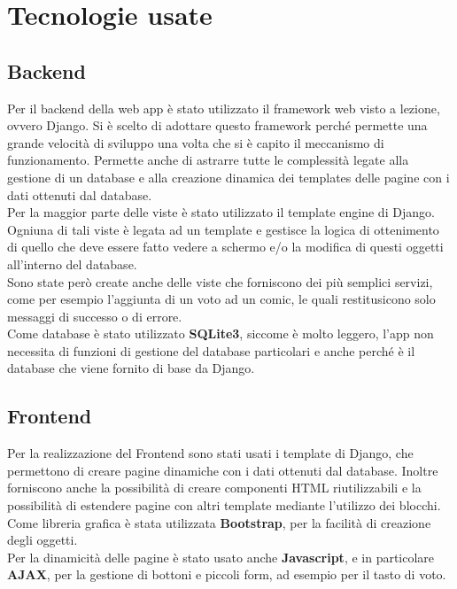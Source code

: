 \section{Tecnologie usate}

\subsection{Backend}
Per il backend della web app è stato utilizzato il framework web visto a lezione, ovvero Django.
Si è scelto di adottare questo framework perché permette una grande velocità
di sviluppo una volta che si è capito il meccanismo di funzionamento. Permette
anche di astrarre tutte le complessità legate alla gestione di un database e alla
creazione dinamica dei templates delle pagine con i dati ottenuti dal database.
\\Per la maggior parte delle viste è stato utilizzato il template engine di Django.
Ogniuna di tali viste è legata ad un template e gestisce la logica di ottenimento di quello che
deve essere fatto vedere a schermo e/o la modifica di questi oggetti all’interno
del database.
\\Sono state però create anche delle viste che forniscono dei più semplici servizi,
come per esempio l'aggiunta di un voto ad un comic, le quali restitusicono solo
messaggi di successo o di errore.
\\Come database è stato utilizzato \textbf{SQLite3}, siccome è molto leggero,
l'app non necessita di funzioni di gestione del database particolari e anche perché
è il database che viene fornito di base da Django.


\subsection{Frontend}
Per la realizzazione del Frontend sono stati usati i template di Django,
che permettono di creare pagine dinamiche con i dati ottenuti dal database.
Inoltre forniscono anche la possibilità di creare componenti HTML riutilizzabili
e la possibilità di estendere pagine con altri template mediante l'utilizzo dei blocchi.
\\Come libreria grafica è stata utilizzata \textbf{Bootstrap}, per la facilità di
creazione degli oggetti.
\\Per la dinamicità delle pagine è stato usato anche \textbf{Javascript}, e in particolare
\textbf{AJAX}, per la gestione di bottoni e piccoli form, ad esempio per il tasto di voto.